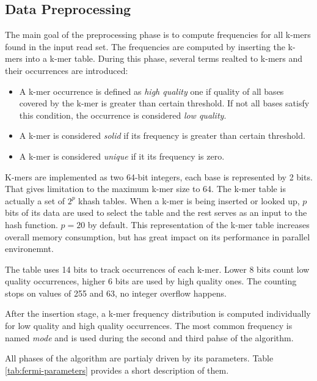 \subsection{Data Preprocessing}
\label{subsec:fermi-data-preprocessing}

The main goal of the preprocessing phase is to compute frequencies for all k-mers found in the input read set. The frequencies are computed by inserting the k-mers into a k-mer table. During this phase, several terms realted to k-mers and their occurrences are introduced:
\begin{itemize}
\item A k-mer occurrence is defined as \textit{high quality} one if quality of all bases covered by the k-mer is greater than certain threshold. If not all bases satisfy this condition, the occurrence is considered \textit{low quality}.
\item A k-mer is considered \textit{solid} if its frequency is greater than certain threshold.
\item A k-mer is considered \textit{unique} if it its frequency is zero.
\end{itemize}
K-mers are implemented as two 64-bit integers, each base is represented by 2 bits. That gives limitation to the maximum k-mer size to 64. The k-mer table is actually a set of $2^p$ khash tables. When a k-mer is being inserted or looked up, $p$ bits of its data are used to select the table and the rest serves as an input to the hash function. $p = 20$ by default. This representation of the k-mer table increases overall memory consumption, but has great impact on its performance in parallel environemnt. 

The table uses 14 bits to track occurrences of each k-mer. Lower 8 bits count low quality occurrences, higher 6 bits are used by high quality ones. The counting stops on values of 255 and 63, no integer overflow happens.

After the insertion stage, a k-mer frequency distribution is computed individually for low quality and high quality occurrences. The most common frequency is named \textit{mode} and is used during the second and third pahse of the algorithm.

All phases of the algorithm are partialy driven by its parameters. Table \ref{tab:fermi-parameters} provides a short description of them.

